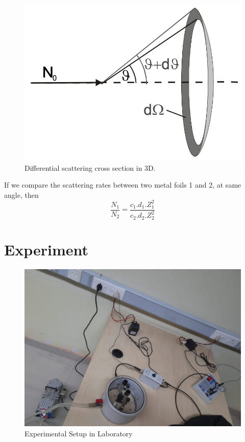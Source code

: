 \documentclass[a4paper, amsfonts, amssymb, amsmath, reprint, showkeys, nofootinbib, twoside]{revtex4-1}
\begin{document}
\begin{figure}[H]
	\centering
	\includegraphics[scale=0.3]{4}
	\caption{Differential scattering cross section in 3D.}
\end{figure}

If we compare the scattering rates between two metal foils 1 and 2, at same angle, then
\begin{equation}
	\frac{N_1}{N_2}=\frac{c_1.d_1.Z^2_1}{c_2.d_2.Z^2_2}
\end{equation}


\section{Experiment}
\begin{figure}[H]
	\centering
	\includegraphics[scale=0.15]{3}
	\caption{Experimental Setup in Laboratory}
\end{figure}
\end{document}
